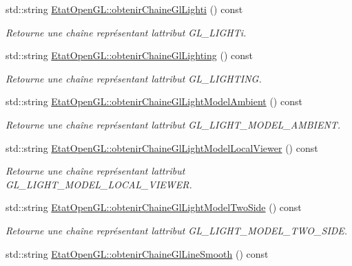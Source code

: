 \begin{DoxyCompactItemize}
std\+::string \hyperlink{group__utilitaire_ga373300784f0f42aea9a0d6c78cb01623}{Etat\+Open\+G\+L\+::obtenir\+Chaine\+Gl\+Lighti} () const 
\begin{DoxyCompactList}\small\item\em Retourne une chaîne représentant l\textquotesingle{}attribut G\+L\+\_\+\+L\+I\+G\+H\+Ti. \end{DoxyCompactList}\item 
std\+::string \hyperlink{group__utilitaire_gac26fe35af4bad0a50b4890f21e61ea02}{Etat\+Open\+G\+L\+::obtenir\+Chaine\+Gl\+Lighting} () const 
\begin{DoxyCompactList}\small\item\em Retourne une chaîne représentant l\textquotesingle{}attribut G\+L\+\_\+\+L\+I\+G\+H\+T\+I\+N\+G. \end{DoxyCompactList}\item 
std\+::string \hyperlink{group__utilitaire_gafee564b101971fe6c901050b13522dc7}{Etat\+Open\+G\+L\+::obtenir\+Chaine\+Gl\+Light\+Model\+Ambient} () const 
\begin{DoxyCompactList}\small\item\em Retourne une chaîne représentant l\textquotesingle{}attribut G\+L\+\_\+\+L\+I\+G\+H\+T\+\_\+\+M\+O\+D\+E\+L\+\_\+\+A\+M\+B\+I\+E\+N\+T. \end{DoxyCompactList}\item 
std\+::string \hyperlink{group__utilitaire_gad3dbc66405e9f773549840afceebda51}{Etat\+Open\+G\+L\+::obtenir\+Chaine\+Gl\+Light\+Model\+Local\+Viewer} () const 
\begin{DoxyCompactList}\small\item\em Retourne une chaîne représentant l\textquotesingle{}attribut G\+L\+\_\+\+L\+I\+G\+H\+T\+\_\+\+M\+O\+D\+E\+L\+\_\+\+L\+O\+C\+A\+L\+\_\+\+V\+I\+E\+W\+E\+R. \end{DoxyCompactList}\item 
std\+::string \hyperlink{group__utilitaire_gab355049dd400e05dcf9057355f954b2d}{Etat\+Open\+G\+L\+::obtenir\+Chaine\+Gl\+Light\+Model\+Two\+Side} () const 
\begin{DoxyCompactList}\small\item\em Retourne une chaîne représentant l\textquotesingle{}attribut G\+L\+\_\+\+L\+I\+G\+H\+T\+\_\+\+M\+O\+D\+E\+L\+\_\+\+T\+W\+O\+\_\+\+S\+I\+D\+E. \end{DoxyCompactList}\item 
std\+::string \hyperlink{group__utilitaire_ga3823c538863f06203e0f72df0af8e517}{Etat\+Open\+G\+L\+::obtenir\+Chaine\+Gl\+Line\+Smooth} () const 

\end{DoxyCompactItemize}
